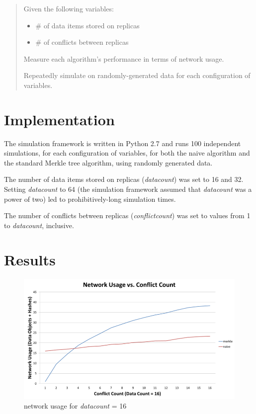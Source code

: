 \documentclass[11pt,letterpaper]{article}
\begin{document}
\begin{quote}
Given the following variables:
\begin{itemize}
\item \# of data items stored on replicas
\item \# of conflicts between replicas
\end{itemize}
Measure each algorithm's performance in terms of network usage.

Repeatedly simulate on randomly-generated data for each configuration of variables.
\end{quote}

\section{Implementation}
The simulation framework is written in Python 2.7 and runs 100 independent simulations, for each configuration of variables, for both the naive algorithm and the standard Merkle tree algorithm, using randomly generated data.

The number of data items stored on replicas (\textit{datacount}) was set to 16 and 32. Setting \textit{datacount} to 64 (the simulation framework assumed that \textit{datacount} was a power of two) led to prohibitively-long simulation times.

The number of conflicts between replicas (\textit{conflictcount}) was set to values from 1 to \textit{datacount}, inclusive.

\section{Results}
\begin{figure}[hbtp]
\caption{network usage for \textit{datacount} = 16}
\centering
\includegraphics[scale=0.7]{results16.png} 
\end{figure}
\end{document}
